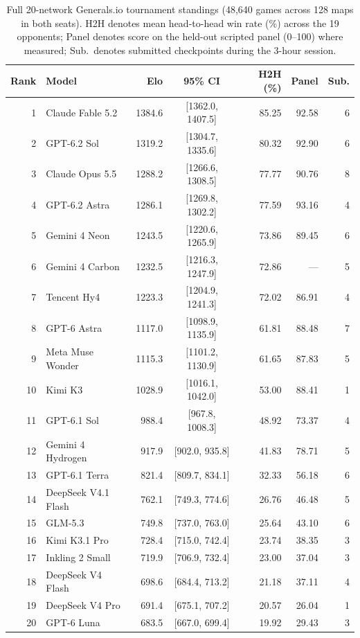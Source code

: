 \documentclass[11pt,letterpaper]{article}
\begin{document}
\begin{table}[htbp]
\centering
\caption{Full 20-network Generals.io tournament standings (48,640 games across 128 maps in both seats). H2H denotes mean head-to-head win rate (\%) across the 19 opponents; Panel denotes score on the held-out scripted panel (0--100) where measured; Sub.\ denotes submitted checkpoints during the 3-hour session.}
\label{tab:generals_full}
\footnotesize
\begin{tabular}{@{}r l r c r r r@{}}
\toprule
\textbf{Rank} & \textbf{Model} & \textbf{Elo} & \textbf{95\% CI} & \textbf{H2H (\%)} & \textbf{Panel} & \textbf{Sub.} \\
\midrule
1  & Claude Fable 5.2    & 1384.6 & [1362.0, 1407.5] & 85.25 & 92.58 & 6 \\
2  & GPT-6.2 Sol         & 1319.2 & [1304.7, 1335.6] & 80.32 & 92.90 & 6 \\
3  & Claude Opus 5.5     & 1288.2 & [1266.6, 1308.5] & 77.77 & 90.76 & 8 \\
4  & GPT-6.2 Astra       & 1286.1 & [1269.8, 1302.2] & 77.59 & 93.16 & 4 \\
5  & Gemini 4 Neon       & 1243.5 & [1220.6, 1265.9] & 73.86 & 89.45 & 6 \\
6  & Gemini 4 Carbon     & 1232.5 & [1216.3, 1247.9] & 72.86 & ---   & 5 \\
7  & Tencent Hy4         & 1223.3 & [1204.9, 1241.3] & 72.02 & 86.91 & 4 \\
8  & GPT-6 Astra         & 1117.0 & [1098.9, 1135.9] & 61.81 & 88.48 & 7 \\
9  & Meta Muse Wonder    & 1115.3 & [1101.2, 1130.9] & 61.65 & 87.83 & 5 \\
10 & Kimi K3             & 1028.9 & [1016.1, 1042.0] & 53.00 & 88.41 & 1 \\
11 & GPT-6.1 Sol         &  988.4 & [967.8, 1008.3]  & 48.92 & 73.37 & 4 \\
12 & Gemini 4 Hydrogen   &  917.9 & [902.0, 935.8]   & 41.83 & 78.71 & 5 \\
13 & GPT-6.1 Terra       &  821.4 & [809.7, 834.1]   & 32.33 & 56.18 & 6 \\
14 & DeepSeek V4.1 Flash &  762.1 & [749.3, 774.6]   & 26.76 & 46.48 & 5 \\
15 & GLM-5.3             &  749.8 & [737.0, 763.0]   & 25.64 & 43.10 & 6 \\
16 & Kimi K3.1 Pro       &  728.4 & [715.0, 742.4]   & 23.74 & 38.35 & 3 \\
17 & Inkling 2 Small     &  719.9 & [706.9, 732.4]   & 23.00 & 37.04 & 3 \\
18 & DeepSeek V4 Flash   &  698.6 & [684.4, 713.2]   & 21.18 & 37.11 & 4 \\
19 & DeepSeek V4 Pro     &  691.4 & [675.1, 707.2]   & 20.57 & 26.04 & 1 \\
20 & GPT-6 Luna          &  683.5 & [667.0, 699.4]   & 19.92 & 29.43 & 3 \\
\bottomrule
\end{tabular}
\end{table}
\end{document}
